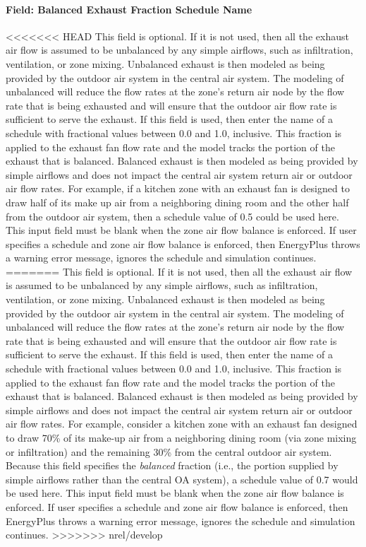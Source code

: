 \paragraph{Field: Balanced Exhaust Fraction Schedule Name}\label{field-balanced-exhaust-fraction-schedule-name}

<<<<<<< HEAD
This field is optional. If it is not used, then all the exhaust air flow is assumed to be unbalanced by any simple airflows, such as infiltration, ventilation, or zone mixing. Unbalanced exhaust is then modeled as being provided by the outdoor air system in the central air system. The modeling of unbalanced will reduce the flow rates at the zone's return air node by the flow rate that is being exhausted and will ensure that the outdoor air flow rate is sufficient to serve the exhaust. If this field is used, then enter the name of a schedule with fractional values between 0.0 and 1.0, inclusive. This fraction is applied to the exhaust fan flow rate and the model tracks the portion of the exhaust that is balanced. Balanced exhaust is then modeled as being provided by simple airflows and does not impact the central air system return air or outdoor air flow rates. For example, if a kitchen zone with an exhaust fan is designed to draw half of its make up air from a neighboring dining room and the other half from the outdoor air system, then a schedule value of 0.5 could be used here. This input field must be blank when the zone air flow balance is enforced. If user specifies a schedule and zone air flow balance is enforced, then EnergyPlus throws a warning error message, ignores the schedule and simulation continues.
=======
This field is optional. If it is not used, then all the exhaust air flow is assumed to be unbalanced by any simple airflows, such as infiltration, ventilation, or zone mixing. Unbalanced exhaust is then modeled as being provided by the outdoor air system in the central air system. The modeling of unbalanced will reduce the flow rates at the zone's return air node by the flow rate that is being exhausted and will ensure that the outdoor air flow rate is sufficient to serve the exhaust. If this field is used, then enter the name of a schedule with fractional values between 0.0 and 1.0, inclusive. This fraction is applied to the exhaust fan flow rate and the model tracks the portion of the exhaust that is balanced. Balanced exhaust is then modeled as being provided by simple airflows and does not impact the central air system return air or outdoor air flow rates. For example, consider a kitchen zone with an exhaust fan designed to draw 70\% of its make-up air from a neighboring dining room (via zone mixing or infiltration) and the remaining 30\% from the central outdoor air system. Because this field specifies the \emph{balanced} fraction (i.e., the portion supplied by simple airflows rather than the central OA system), a schedule value of 0.7 would be used here. This input field must be blank when the zone air flow balance is enforced. If user specifies a schedule and zone air flow balance is enforced, then EnergyPlus throws a warning error message, ignores the schedule and simulation continues.
>>>>>>> nrel/develop

